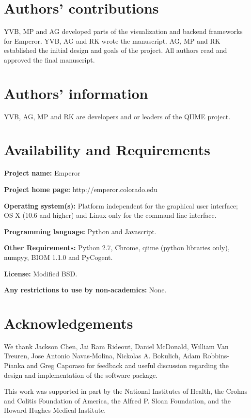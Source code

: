 \section{Authors' contributions}
YVB, MP and AG developed parts of the visualization and backend frameworks for Emperor. YVB, AG and RK wrote the manuscript. AG, MP and RK established the initial design and goals of the project. All authors read and approved the final manuscript.

\section{Authors' information}
YVB, AG, MP and RK are developers and or leaders of the QIIME project.

\section{Availability and Requirements}

\textbf{Project name:} Emperor

\textbf{Project home page:} http://emperor.colorado.edu

\textbf{Operating system(s):} Platform independent for the graphical user interface; OS X (10.6 and higher) and Linux only for the command line interface.

\textbf{Programming language:} Python and Javascript.

\textbf{Other Requirements:} Python 2.7, Chrome, \gls{qiime} (python libraries only), \gls{numpy}y, BIOM 1.1.0 and PyCogent.

\textbf{License:} Modified BSD.

\textbf{Any restrictions to use by non-academics:} None.

\section{Acknowledgements}

We thank Jackson Chen, Jai Ram Rideout, Daniel McDonald, William Van Treuren, Jose Antonio Navas-Molina, Nickolas A. Bokulich, Adam Robbins-Pianka and Greg Caporaso for feedback and useful discussion regarding the design and implementation of the software package.
 
This work was supported in part by the National Institutes of Health, the Crohns and Colitis Foundation of America, the Alfred P. Sloan Foundation, and the Howard Hughes Medical Institute.